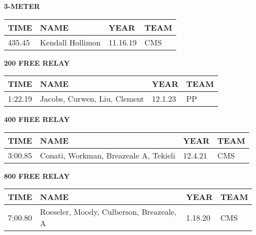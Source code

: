 \vspace{0.4cm}

\begin{center}
\begin{minipage}[t]{0.7\textwidth}
\centering
\textbf{3-METER}\\[0.05cm]
\begin{tabular}{@{}p{1.8cm}p{2.8cm}p{1.2cm}p{1.4cm}@{}}
\hline
\textbf{TIME} & \textbf{NAME} & \textbf{YEAR} & \textbf{TEAM} \\
\hline
435.45 & Kendall Hollimon & 11.16.19 & CMS \\
\hline
\end{tabular}
\end{minipage}
\end{center}

\vspace{0.4cm}

\begin{center}
\begin{minipage}[t]{0.7\textwidth}
\centering
\textbf{200 FREE RELAY}\\[0.05cm]
\begin{tabular}{@{}p{1.8cm}p{2.8cm}p{1.2cm}p{1.4cm}@{}}
\hline
\textbf{TIME} & \textbf{NAME} & \textbf{YEAR} & \textbf{TEAM} \\
\hline
1:22.19 & Jacobs, Curwen, Liu, Clement & 12.1.23 & PP \\
\hline
\end{tabular}
\end{minipage}
\end{center}

\vspace{0.4cm}

\begin{center}
\begin{minipage}[t]{0.7\textwidth}
\centering
\textbf{400 FREE RELAY}\\[0.05cm]
\begin{tabular}{@{}p{1.8cm}p{2.8cm}p{1.2cm}p{1.4cm}@{}}
\hline
\textbf{TIME} & \textbf{NAME} & \textbf{YEAR} & \textbf{TEAM} \\
\hline
3:00.85 & Conati, Workman, Breazeale A, Tekieli & 12.4.21 & CMS \\
\hline
\end{tabular}
\end{minipage}
\end{center}

\vspace{0.4cm}

\begin{center}
\begin{minipage}[t]{0.7\textwidth}
\centering
\textbf{800 FREE RELAY}\\[0.05cm]
\begin{tabular}{@{}p{1.8cm}p{2.8cm}p{1.2cm}p{1.4cm}@{}}
\hline
\textbf{TIME} & \textbf{NAME} & \textbf{YEAR} & \textbf{TEAM} \\
\hline
7:00.80 & Roeseler, Moody, Culberson, Breazeale, A & 1.18.20 & CMS \\
\hline
\end{tabular}
\end{minipage}
\end{center}

